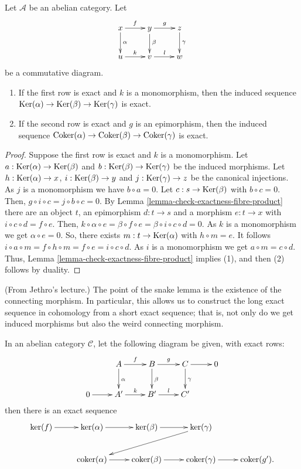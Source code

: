 \begin{lemma}
\label{lemma-exact-kernel-sequence}
Let $\mathcal{A}$ be an abelian category. Let
$$
\xymatrix{
x \ar[r]^f \ar[d]^\alpha &
y \ar[r]^g \ar[d]^\beta &
z \ar[d]^\gamma\\
u \ar[r]^k & v \ar[r]^l & w
}
$$
be a commutative diagram.
\begin{enumerate}
\item If the first row is exact and $k$ is a
monomorphism, then the induced
sequence $\mathop{\mathrm{Ker}}(\alpha) \to \mathop{\mathrm{Ker}}(\beta) \to
\mathop{\mathrm{Ker}}(\gamma)$
is exact.
\item If the second row is exact and $g$ is
an epimorphism, then the induced
sequence
$\mathop{\mathrm{Coker}}(\alpha) \to \mathop{\mathrm{Coker}}(\beta) \to
\mathop{\mathrm{Coker}}(\gamma)$
is exact.
\end{enumerate}
\end{lemma}

\begin{proof}
Suppose the first row is exact and $k$ is a
monomorphism. Let
$a:\mathop{\mathrm{Ker}}(\alpha)\to\mathop{\mathrm{Ker}}(\beta)$ and
$b:\mathop{\mathrm{Ker}}(\beta)\to\mathop{\mathrm{Ker}}(\gamma)$ be the induced
morphisms.
Let $h:\mathop{\mathrm{Ker}}(\alpha)\to x$, $i:\mathop{\mathrm{Ker}}(\beta)\to
y$ and
$j:\mathop{\mathrm{Ker}}(\gamma)\to z$ be the canonical
injections. As $j$ is
a monomorphism we have $b\circ a=0$. Let
$c:s\to\mathop{\mathrm{Ker}}(\beta)$
with $b\circ c=0$. Then, $g\circ i\circ
c=j\circ b\circ c=0$. By
Lemma
\ref{lemma-check-exactness-fibre-product}
there are an object $t$, an
epimorphism $d:t\to s$ and a morphism $e:t\to
x$ with
$i\circ c\circ d=f\circ e$. Then,
$k\circ \alpha\circ e=\beta\circ f\circ
e=\beta\circ i\circ c\circ d=0$.
As $k$ is a monomorphism we get $\alpha\circ
e=0$. So, there exists
$m:t\to\mathop{\mathrm{Ker}}(\alpha)$ with $h\circ m=e$. It
follows
$i\circ a\circ m=f\circ h\circ m=f\circ
e=i\circ c\circ d$.
As $i$ is a monomorphism we get $a\circ
m=c\circ d$. Thus,
Lemma
\ref{lemma-check-exactness-fibre-product}
implies (1), and then
(2) follows by duality.
\end{proof}

\noindent
(From Jethro's lecture.)
The point of the snake lemma is the
existence of the connecting morphism.
In particular, this allows us to
construct the long exact sequence in
cohomology from a short exact sequence;
that is, not only do we get induced
morphisms but also the weird connecting
morphism.

\begin{lemma}
\label{lemma-snake-jethro}
In an abelian category $\mathcal{C}$,
let the following diagram be given,
with exact rows:
$$
\xymatrix{
& A \ar[r]^f \ar[d]^\alpha &
B \ar[r]^g \ar[d]^\beta &
C \ar[r] \ar[d]^\gamma &
0 \\
0 \ar[r] & A' \ar[r]^k & B' \ar[r]^l & C'
}
$$
then there is an exact sequence
$$
\xymatrix{
\ker(f)\ar[r]
&\ker(\alpha) \ar[r]
&\ker(\beta)\ar[r]
&\ker(\gamma)\ar[lld]\\
&\operatorname{coker}(\alpha)\ar[r]
&\operatorname{coker}(\beta)\ar[r]
&\operatorname{coker}(\gamma)\ar[r]
&\operatorname{coker}(g').
}
$$
\end{lemma}

